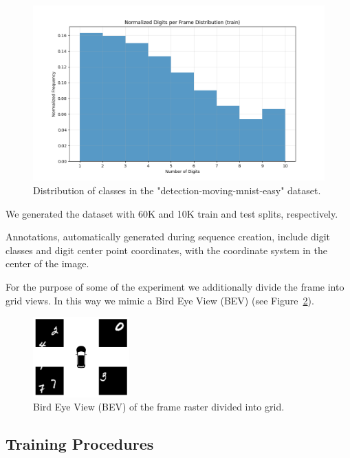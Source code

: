 \begin{figure}
    \centering
    \includegraphics[width=\textwidth]{figures/figure_method_dataset_train_digits_per_frame.png}
    \caption{Distribution of classes in the "detection-moving-mnist-easy" dataset.}
    \label{fig:figure_method_dataset_train_digits_per_frame}
\end{figure}


We generated the dataset with 60K and 10K train and test splits, respectively.

Annotations, automatically generated during sequence creation, include digit classes and digit center point coordinates, with the coordinate system in the center of the image.

For the purpose of some of the experiment we additionally divide the frame into grid views. In this way we mimic a Bird Eye View (BEV) (see Figure~\ref{fig:figure_methods_dataset_image_view_bev}).

\begin{figure}
    \centering
    \includegraphics[width=0.33\textwidth]{figures/figure_methods_dataset_image_view_bev.png}
    \caption{Bird Eye View (BEV) of the frame raster divided into grid.}
    \label{fig:figure_methods_dataset_image_view_bev}
\end{figure}


\subsection{Training Procedures} \label{TrainingProcedures}

